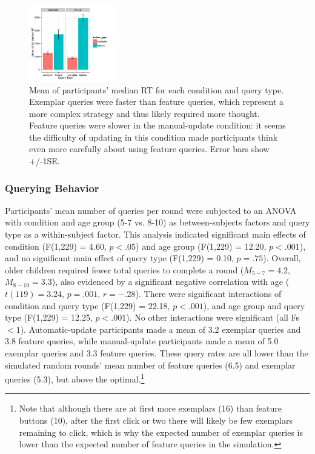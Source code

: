 \documentclass[10pt,letterpaper]{article}
\begin{document}
\begin{figure}[h]
  \centering
  \includegraphics[width=0.33\textwidth]{figures/RT_by_condition_query_type}
  \caption{Mean of participants' median RT for each condition and query type. 
Exemplar queries were faster than feature queries, which represent a more complex 
strategy and thus likely required more thought. Feature queries were slower in the 
manual-update condition: it seems the difficulty of updating in this condition made 
participants think even more carefully about using feature queries. Error bars show 
+/-1SE.}
  \label{fig:basic-rt}
\end{figure} 


\subsubsection{Querying Behavior}

Participants' mean number of queries per round were subjected to an 
ANOVA with condition and age group (5-7 vs. 8-10) as between-subjects factors and query type as a within-subject factor. This analysis indicated significant main effects of condition (F(1,229) = 4.60, $p<.05$) and age group (F(1,229) = 12.20, $p<.001$), and no significant main effect of query type (F(1,229) = 0.10, $p=.75$). Overall, older children required fewer total queries to complete a round ($M_{5-7} = 4.2$, $M_{8-10} = 3.3$),
also evidenced by a significant negative correlation with age ($t(119) = 3.24$, $p=.001$, $r=-.28$). There were significant interactions of condition and query type (F(1,229) = 22.18, 
$p<.001$), and age group and query type (F(1,229) = 12.25, $p<.001$). No other interactions were significant (all Fs $<1$). Automatic-update participants made a mean of 3.2 exemplar queries and 3.8 feature queries, while manual-update participants made a mean of 5.0 exemplar queries and 3.3 feature queries.
These query rates are all lower than the simulated random rounds' mean number of feature queries (6.5) and exemplar queries (5.3), but above the optimal.\footnote{Note that although there are at first more exemplars (16) than 
feature buttons (10), after the first click or two there will likely be few 
exemplars remaining to click, which is why the expected number of exemplar 
queries is lower than the expected number of feature queries in the simulation.} 
\end{document}
